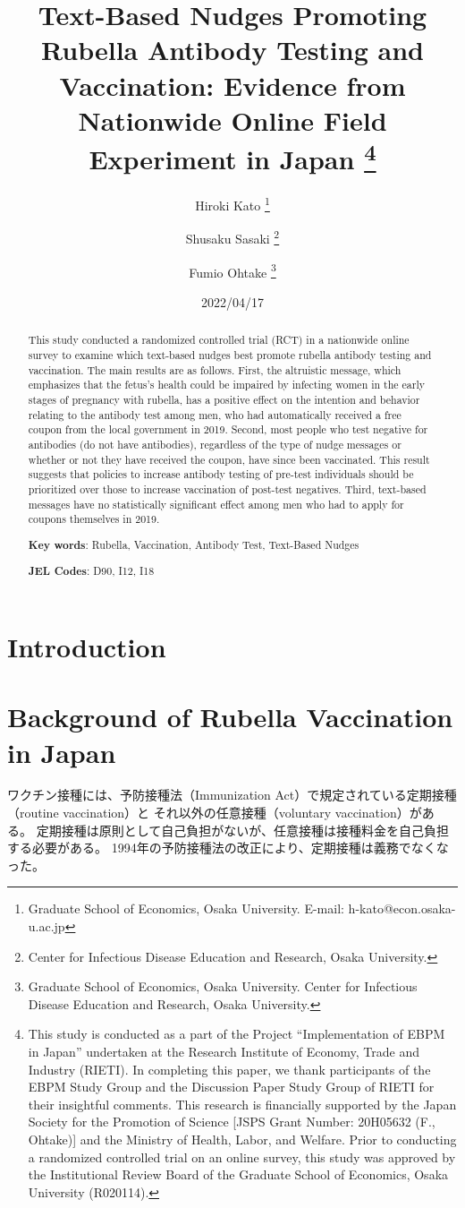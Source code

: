 \documentclass[
  11pt,
  a4paper,
]{article}
\title{Text-Based Nudges Promoting Rubella Antibody Testing and Vaccination:
Evidence from Nationwide Online Field Experiment in Japan  \thanks{This study is conducted as a part of the Project ``Implementation of EBPM in Japan''
undertaken at the Research Institute of Economy, Trade and Industry (RIETI).
In completing this paper,
we thank participants of the EBPM Study Group and
the Discussion Paper Study Group of RIETI for their insightful comments.
This research is financially supported by
the Japan Society for the Promotion of Science
{[}JSPS Grant Number: 20H05632 (F., Ohtake){]}
and the Ministry of Health, Labor, and Welfare.
Prior to conducting a randomized controlled trial on an online survey,
this study was approved by the Institutional Review Board
of the Graduate School of Economics, Osaka University (R020114).}  }
\author{
    Hiroki Kato
  \thanks{Graduate School of Economics, Osaka University. E-mail: h-kato@econ.osaka-u.ac.jp  }
  \and
    Shusaku Sasaki
  \thanks{Center for Infectious Disease Education and Research, Osaka University.  }
  \and
    Fumio Ohtake
  \thanks{Graduate School of Economics, Osaka University.
Center for Infectious Disease Education and Research, Osaka University.  }
  \and
  }
\date{2022/04/17}
\begin{document}
\begin{spacing}{1}
  \maketitle
\end{spacing}
\begin{spacing}{1}
  \begin{abstract}
    This study conducted a randomized controlled trial (RCT) in a nationwide online survey
    to examine which text-based nudges best promote rubella antibody testing and vaccination.
    The main results are as follows.
    First, the altruistic message,
    which emphasizes that the fetus's health could be impaired by
    infecting women in the early stages of pregnancy with rubella,
    has a positive effect on the intention and behavior relating to the antibody test among men,
    who had automatically received a free coupon from the local government in 2019.
    Second, most people who test negative for antibodies (do not have antibodies),
    regardless of the type of nudge messages or whether or not they have received the coupon,
    have since been vaccinated.
    This result suggests that policies to increase antibody testing of pre-test individuals
    should be prioritized over those to increase vaccination of post-test negatives.
    Third, text-based messages have no statistically significant effect
    among men who had to apply for coupons themselves in 2019.
    
                \noindent
    \textbf{Key words}: Rubella, Vaccination, Antibody Test, Text-Based Nudges
        
        \noindent
    \textbf{JEL Codes}: D90, I12, I18
            
  \end{abstract}
\end{spacing}

\hypertarget{intro}{%
\section{Introduction}\label{intro}}

\hypertarget{background}{%
\section{Background of Rubella Vaccination in Japan}\label{background}}

ワクチン接種には、予防接種法（Immunization Act）で規定されている定期接種（routine vaccination）と
それ以外の任意接種（voluntary vaccination）がある。
定期接種は原則として自己負担がないが、任意接種は接種料金を自己負担する必要がある。
1994年の予防接種法の改正により、定期接種は義務でなくなった。
\end{document}
